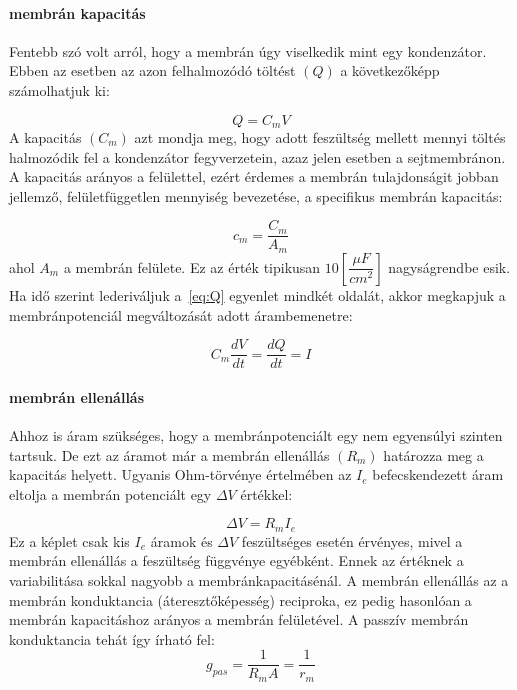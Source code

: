 \FloatBarrier
\paragraph{membrán kapacitás}
Fentebb szó volt arról, hogy a membrán úgy viselkedik mint egy kondenzátor. Ebben az esetben az azon felhalmozódó töltést $(Q)$ a következőképp számolhatjuk ki:

\begin{equation}\label{eq:Q}
	Q = C_m V 
\end{equation}
A kapacitás $(C_m)$ azt mondja meg, hogy adott feszültség mellett mennyi töltés halmozódik fel a kondenzátor fegyverzetein, azaz jelen esetben a sejtmembránon. A kapacitás arányos a felülettel, ezért érdemes a membrán tulajdonságit jobban jellemző, felületfüggetlen mennyiség bevezetése, a specifikus membrán kapacitás:

\begin{equation}\label{eq:cm}
	c_m = \frac{C_m}{A_m}
\end{equation}
ahol $A_m$ a membrán felülete. Ez az érték tipikusan $10 \left[ \dfrac{\mu F}{cm^2}\right]$ nagyságrendbe esik.
Ha idő szerint lederiváljuk a~\ref{eq:Q} egyenlet mindkét oldalát, akkor megkapjuk a membránpotenciál megváltozását adott árambemenetre:

\begin{equation}\label{eq:dV}
	C_m \dfrac{dV}{dt} = \dfrac{dQ}{dt} = I
\end{equation}

\paragraph{membrán ellenállás}
Ahhoz is áram szükséges, hogy a membránpotenciált egy nem egyensúlyi szinten tartsuk. De ezt az áramot már a membrán ellenállás $(R_m)$ határozza meg a kapacitás helyett. Ugyanis Ohm-törvénye értelmében az $I_e$ befecskendezett áram eltolja a membrán potenciált egy $\Delta V$ értékkel:

\begin{equation}\label{eq:Rm}
	\Delta V = R_m I_e
\end{equation}
Ez a képlet csak kis $I_e$ áramok és $\Delta V$ feszültséges esetén érvényes, mivel a membrán ellenállás a feszültség függvénye egyébként.
Ennek az értéknek a variabilitása sokkal nagyobb a membránkapacitásénál. A membrán ellenállás az a membrán konduktancia (áteresztőképesség) reciproka, ez pedig hasonlóan a membrán kapacitáshoz arányos a membrán felületével. A passzív membrán konduktancia tehát így írható fel:
\begin{equation}\label{eq:gpas}
	g_{pas} = \dfrac{1}{R_m A} = \dfrac{1}{r_m}
\end{equation}


